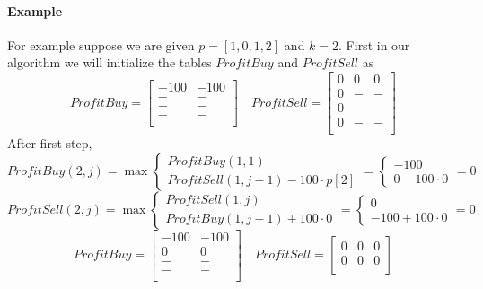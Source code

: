 \documentclass[answers]{exam}
\begin{document}
\begin{questions}
\begin{solution}
\paragraph{Example}
For example suppose we are given $p = [1, 0, 1, 2]$ and $k = 2$. First in our algorithm we will initialize the tables $ProfitBuy$ and $ProfitSell$ as
\[
    ProfitBuy =
    \begin{bmatrix}
    -100 & -100 \\
    - & - \\
    - & - \\
    - & - \\
    \end{bmatrix} \quad
    ProfitSell =
    \begin{bmatrix}
    0 & 0 & 0 \\
    0 & - & - \\
    0 & - & -\\
    0 & - & - \\
    \end{bmatrix}
\]
After first step,
    \[
        ProfitBuy(2, j) = \max
        \begin{cases}
            ProfitBuy(1, 1)\\
            ProfitSell(1, j-1) - 100 \cdot p[2]
        \end{cases}
        =
        \begin{cases}
            -100\\
            0 - 100 \cdot 0
        \end{cases}
        = 0
    \]
    \[
        ProfitSell(2, j) = \max
        \begin{cases}
            ProfitSell(1, j)\\
            ProfitBuy(1, j-1) + 100 \cdot 0
        \end{cases}
        =
        \begin{cases}
            0\\
            -100 + 100 \cdot 0
        \end{cases}
        = 0
    \]
\[
    ProfitBuy =
    \begin{bmatrix}
    -100 & -100 \\
    0 & 0 \\
    - & - \\
    - & - \\
    \end{bmatrix} \quad
    ProfitSell =
    \begin{bmatrix}
    0 & 0 & 0 \\
    0 & 0 & 0 \\

\end{bmatrix}\]
\end{solution}
\end{questions}
\end{document}
